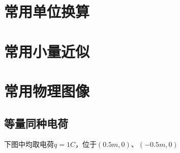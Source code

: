 \section{常用单位换算}

\section{常用小量近似}

\section{常用物理图像}

\subsection{等量同种电荷}

下图中均取电荷$q=1C$，位于$(0.5m,0)$、$(-0.5m,0)$

